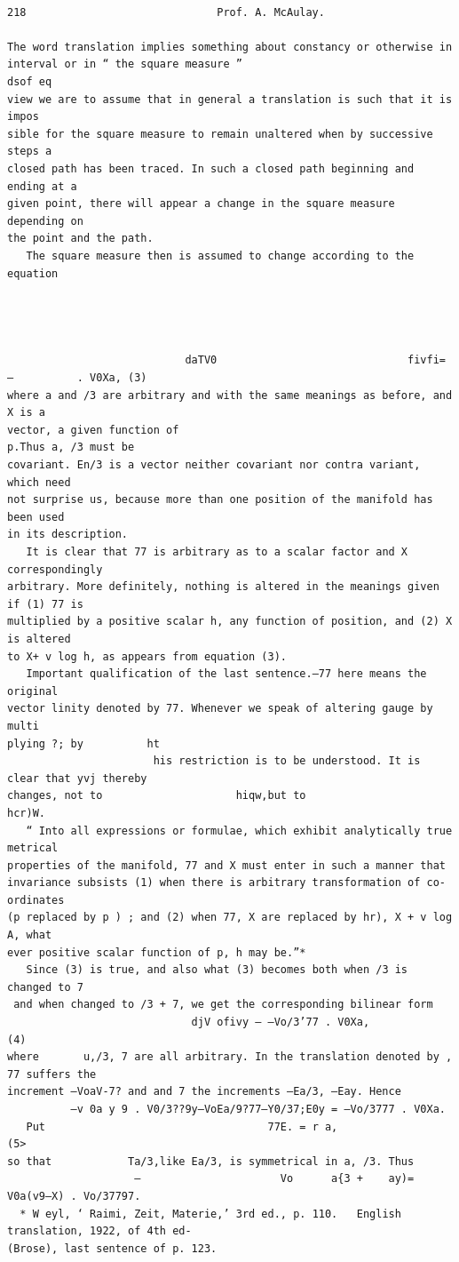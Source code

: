 \documentclass[10pt]{article}
\begin{document}
\clearpage
\begin{verbatim}

218                              Prof. A. McAulay.

The word translation implies something about constancy or otherwise in
interval or in “ the square measure ”                                       dsof eq
view we are to assume that in general a translation is such that it is impos­
sible for the square measure to remain unaltered when by successive steps a
closed path has been traced. In such a closed path beginning and ending at a
given point, there will appear a change in the square measure depending on
the point and the path.
   The square measure then is assumed to change according to the equation




                            daTV0                              fivfi=   —          . V0Xa, (3)
where a and /3 are arbitrary and with the same meanings as before, and X is a
vector, a given function of                                      p.Thus a, /3 must be
covariant. En/3 is a vector neither covariant nor contra variant, which need
not surprise us, because more than one position of the manifold has been used
in its description.
   It is clear that 77 is arbitrary as to a scalar factor and X correspondingly
arbitrary. More definitely, nothing is altered in the meanings given if (1) 77 is
multiplied by a positive scalar h, any function of position, and (2) X is altered
to X+ v log h, as appears from equation (3).
   Important qualification of the last sentence.—77 here means the original
vector linity denoted by 77. Whenever we speak of altering gauge by multi­
plying ?; by          ht
                       his restriction is to be understood. It is clear that yvj thereby
changes, not to                     hiqw,but to                             hcr)W.
   “ Into all expressions or formulae, which exhibit analytically true metrical
properties of the manifold, 77 and X must enter in such a manner that
invariance subsists (1) when there is arbitrary transformation of co-ordinates
(p replaced by p ) ; and (2) when 77, X are replaced by hr), X + v log A, what­
ever positive scalar function of p, h may be.”*
   Since (3) is true, and also what (3) becomes both when /3 is changed to 7
 and when changed to /3 + 7, we get the corresponding bilinear form
                             djV ofivy — —Vo/3’77 . V0Xa,                               (4)
where       u,/3, 7 are all arbitrary. In the translation denoted by , 77 suffers the
increment —VoaV-7? and and 7 the increments —Ea/3, —Eay. Hence
          —v 0a y 9 . V0/3??9y—VoEa/9?77—Y0/37;E0y = —Vo/3777 . V0Xa.
   Put                                   77E. = r a,                                    (5>
so that            Ta/3,like Ea/3, is symmetrical in a, /3. Thus
                    —                      Vo      a{3 +    ay)= V0a(v9—X) . Vo/37797.
  * W eyl, ‘ Raimi, Zeit, Materie,’ 3rd ed., p. 110.   English translation, 1922, of 4th ed-
(Brose), last sentence of p. 123.


\end{verbatim}
\end{document}
